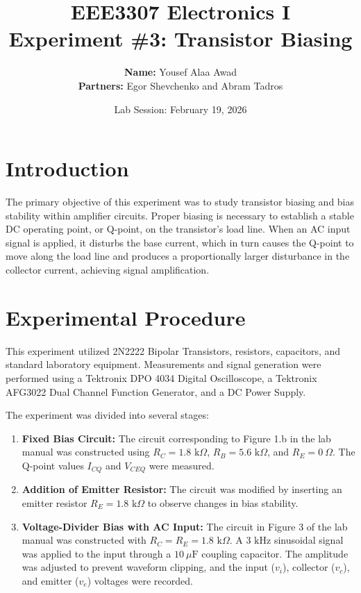 \documentclass[12pt, letterpaper]{article}
\title{
    \vspace{1in}
    \textbf{\huge EEE3307 Electronics I} \\[0.5em]
    \textbf{\Large Experiment \#3: Transistor Biasing}
    \vspace{1.5in}
}
\author{
    \textbf{Name:} Yousef Alaa Awad \\
    \textbf{Partners:} Egor Shevchenko and Abram Tadros
}
\date{Lab Session: February 19, 2026}
\begin{document}
\maketitle
\newpage

\section{Introduction}
The primary objective of this experiment was to study transistor biasing and bias stability within amplifier circuits. Proper biasing is necessary to establish a stable DC operating point, or Q-point, on the transistor's load line. When an AC input signal is applied, it disturbs the base current, which in turn causes the Q-point to move along the load line and produces a proportionally larger disturbance in the collector current, achieving signal amplification. 

\section{Experimental Procedure}
This experiment utilized 2N2222 Bipolar Transistors, resistors, capacitors, and standard laboratory equipment. Measurements and signal generation were performed using a Tektronix DPO 4034 Digital Oscilloscope, a Tektronix AFG3022 Dual Channel Function Generator, and a DC Power Supply.

The experiment was divided into several stages:
\begin{enumerate}
    \item \textbf{Fixed Bias Circuit:} The circuit corresponding to Figure 1.b in the lab manual was constructed using $R_C = 1.8 \text{ k}\Omega$, $R_B = 5.6 \text{ k}\Omega$, and $R_E = 0 \ \Omega$. The Q-point values $I_{CQ}$ and $V_{CEQ}$ were measured. 
    \item \textbf{Addition of Emitter Resistor:} The circuit was modified by inserting an emitter resistor $R_E = 1.8 \text{ k}\Omega$ to observe changes in bias stability. 
    \item \textbf{Voltage-Divider Bias with AC Input:} The circuit in Figure 3 of the lab manual was constructed with $R_C = R_E = 1.8 \text{ k}\Omega$. A $3 \text{ kHz}$ sinusoidal signal was applied to the input through a $10 \ \mu\text{F}$ coupling capacitor. The amplitude was adjusted to prevent waveform clipping, and the input ($v_i$), collector ($v_c$), and emitter ($v_e$) voltages were recorded.
\end{enumerate}
\end{document}
